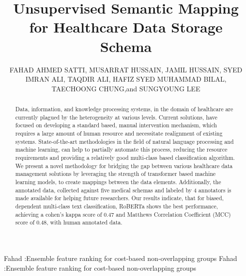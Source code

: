 \documentclass{ieeeaccess}
\begin{document}

\title{Unsupervised Semantic Mapping for Healthcare Data Storage Schema}

\author{ \uppercase{Fahad Ahmed Satti},
	\uppercase{Musarrat Hussain},
	\uppercase{Jamil Hussain},
	\uppercase{Syed Imran Ali}, %
	\uppercase{Taqdir Ali},
	\uppercase{Hafiz Syed Muhammad Bilal},
	\uppercase{TaeChoong Chung},and  \uppercase {Sungyoung Lee}
	}
\address[1]{Department of Computer Science and Engineering, Kyung Hee University, Seocheon-dong, Giheung-gu South Korea (e-mail: \{fahad.satti, musarrat.hussain, imran.ali, bilalrizvi, sylee\}@oslab.khu.ac.kr,  tcchung@khu.ac.kr)}
\address[2]{National Univeristy of Sciences and Technology, School of Electrical Engineering and Computer Science NUST-SEECS, Islamabad, Pakistan (e-mail: \{fahad.satti, bilal.ali\}@seecs.edu.pk)}
\address[3]{Department of Data Science, Sejong University, Seoul, South Korea (e-mail: jamil@sejong.ac.kr)}
\tfootnote{}



\markboth
{Fahad \headeretal:Ensemble feature ranking for cost-based non-overlapping groups}
{Fahad \headeretal:Ensemble feature ranking for cost-based non-overlapping groups}



\begin{abstract}
Data, information, and knowledge processing systems, in the domain of healthcare are currently plagued by the heterogeneity at various levels. Current solutions, have focused on developing a standard based, manual intervention mechanism, which requires a large amount of human resource and necessitate realignment of existing systems. State-of-the-art methodologies in the field of natural language processing and machine learning, can help to partially automate this process, reducing the resource requirements and providing a relatively good multi-class based classification algorithm. We present a novel methodology for bridging the gap between various healthcare data management solutions by leveraging the strength of transformer based machine learning models, to create mappings between the data elements. Additionally, the annotated data, collected against five medical schemas and labeled by 4 annotators is made available for helping future researchers. Our results indicate, that for biased, dependent multi-class text classification, RoBERTa shows the best performance, achieving a cohen's kappa score of 0.47 and Matthews Correlation Coefficient (MCC) score of 0.48, with human annotated data.
\end{abstract}
\end{document}

